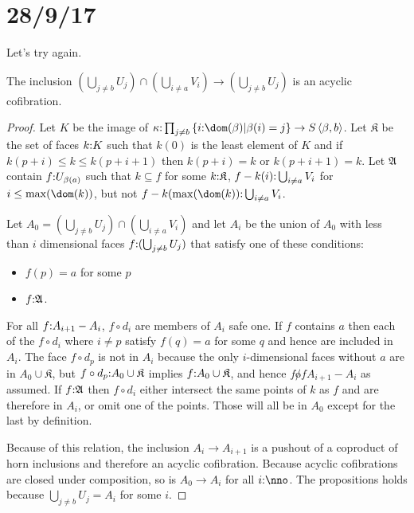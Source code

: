 \documentclass[csh.tex]{subfiles}
\begin{document}
\section{28/9/17}
Let's try again.

\begin{proposition} The inclusion $(\bigcup_{j\neq b} U_j) \cap (\bigcup_{i\neq a} V_i)\to (\bigcup_{j\neq b} U_j) $ is an acyclic cofibration.
\end{proposition}

\begin{proof}
Let $K$ be the image of $\kappa\of \prod_{j\neq b}\set{i\of\dom(\beta)|\beta(i)=j} \to S\tuplet{\beta,b}$. 
Let $\mathfrak K$ be the set of faces $k\mathord : K$ such that $k(0)$ is the least element of $K$ and if $k(p+i) \leq k \leq k(p+i+1)$ then $k(p+i)=k$ or $k(p+i+1) = k$.
Let $\mathfrak A$ contain $f\mathord : U_{\beta(a)}$ such that $k\subseteq f$ for some $k\mathord : \mathfrak K$, $f - k(i) \mathord : \bigcup_{i\neq a} V_i$ for $i \leq \max(\dom(k))$, but not $f - k(\max(\dom(k)) \of \bigcup_{i\neq a} V_i$.

Let $A_0 = (\bigcup_{j\neq b} U_j) \cap (\bigcup_{i\neq a} V_i)$ and let $A_{i}$ be the union of $A_0$ with less than $i$ dimensional faces $f\mathord : (\bigcup_{j\neq b} U_j)$ that satisfy one of these conditions:
\begin{itemize}
\item $f(p) = a$ for some $p$
\item $f\mathord : \mathfrak A$.
\end{itemize}

For all $f\mathord : A_{i+1} - A_i$, $f\circ d_i$ are members of $A_i$ safe one. If $f$ contains $a$ then each of the $f\circ d_i$ where $i\neq p$ satisfy $f(q) = a$ for some $q$ and hence are included in $A_i$. The face $f\circ d_p$ is not in $A_i$ because the only $i$-dimensional faces without $a$ are in $A_0\cup\mathfrak K$, but $f\circ d_p \mathord : A_0\cup\mathfrak K$ implies $f\mathord : A_0\cup\mathfrak K$, and hence $f\not of A_{i+1} - A_i$ as assumed.
If $f\mathord :\mathfrak A$ then $f\circ d_i$ either intersect the same points of $k$ as $f$ and are therefore in $A_i$, or omit one of the points. Those will all be in $A_0$ except for the last by definition.

Because of this relation, the inclusion $A_i\to A_{i+1}$ is a pushout of a coproduct of horn inclusions and therefore an acyclic cofibration. Because acyclic cofibrations are closed under composition, so is $A_0\to A_i$ for all $i\of \nno$.
The propositions holds because $\bigcup_{j\neq b} U_j = A_{i}$ for some $i$.


\end{proof}
\end{document}
